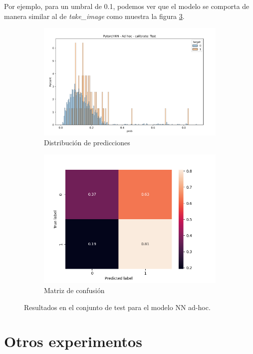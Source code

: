 Por ejemplo, para un umbral de 0.1, podemos ver que el modelo se comporta de
manera similar al de \emph{take\_image} como muestra la figura
\ref{fig:calibrate-bestmoodel-adhoc-test-cm}.

\begin{figure}[h!]
    \begin{subfigure}[b]{\textwidth}
        \centering
        \includegraphics[width=0.7\linewidth]{figures/results/ad-hoc/nn/calibrate/nn_adhoc_calibrate_test.png}
        \caption{Distribución de predicciones}
        \label{fig:calibrate-bestmoodel-adhoc-test-dist}
    \end{subfigure}
    \begin{subfigure}[b]{\textwidth}
        \centering
        \includegraphics[width=0.7\linewidth]{figures/results/ad-hoc/nn/calibrate/NN_cm_test.png}
        \caption{Matriz de confusión}
        \label{fig:calibrate-bestmoodel-adhoc-test-cm}
    \end{subfigure}
    \caption{Resultados en el conjunto de test para el modelo NN ad-hoc.}
\end{figure}

\section{Otros experimentos}

